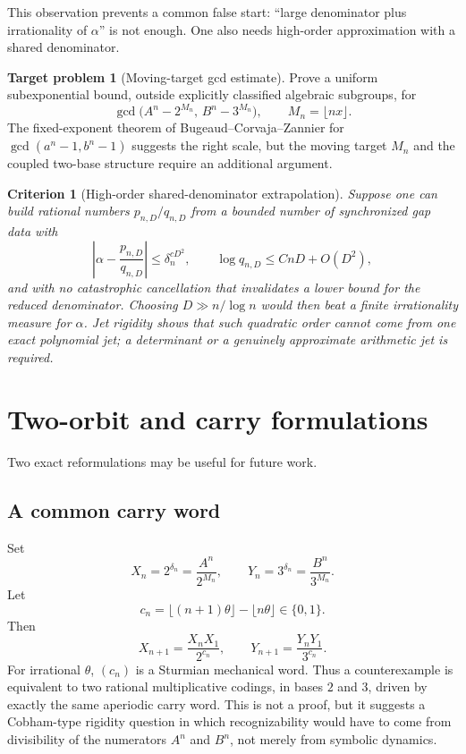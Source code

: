 \documentclass[11pt]{article}
\newtheorem{criterion}[theorem]{Criterion}
\theoremstyle{definition}
\newtheorem{problem}[theorem]{Target problem}
\theoremstyle{remark}
\begin{document}
This observation prevents a common false start: ``large denominator plus irrationality of $\alpha$'' is not enough. One also needs high-order approximation with a shared denominator.

\begin{problem}[Moving-target gcd estimate]\label{prob:moving-gcd}
Prove a uniform subexponential bound, outside explicitly classified algebraic subgroups, for
\[
 \gcd\bigl(A^n-2^{M_n},\,B^n-3^{M_n}\bigr),
 \qquad M_n=\lfloor nx\rfloor.
\]
The fixed-exponent theorem of Bugeaud--Corvaja--Zannier for $\gcd(a^n-1,b^n-1)$ suggests the right scale, but the moving target $M_n$ and the coupled two-base structure require an additional argument.
\end{problem}

\begin{criterion}[High-order shared-denominator extrapolation]
Suppose one can build rational numbers $p_{n,D}/q_{n,D}$ from a bounded number of synchronized gap data with
\[
 \left|\alpha-\frac{p_{n,D}}{q_{n,D}}\right|
 \le \delta_n^{cD^2},
 \qquad
 \log q_{n,D}\le CnD+O(D^2),
\]
and with no catastrophic cancellation that invalidates a lower bound for the reduced denominator. Choosing $D\gg n/\log n$ would then beat a finite irrationality measure for $\alpha$. Jet rigidity shows that such quadratic order cannot come from one exact polynomial jet; a determinant or a genuinely approximate arithmetic jet is required.
\end{criterion}

\section{Two-orbit and carry formulations}\label{sec:dynamics}

Two exact reformulations may be useful for future work.

\subsection{A common carry word}

Set
\[
 X_n=2^{\delta_n}=\frac{A^n}{2^{M_n}},
 \qquad
 Y_n=3^{\delta_n}=\frac{B^n}{3^{M_n}}.
\]
Let
\[
 c_n=\lfloor(n+1)\theta\rfloor-\lfloor n\theta\rfloor\in\{0,1\}.
\]
Then
\begin{equation}\label{eq:carry-dynamics}
 X_{n+1}=\frac{X_nX_1}{2^{c_n}},
 \qquad
 Y_{n+1}=\frac{Y_nY_1}{3^{c_n}}.
\end{equation}
For irrational $\theta$, $(c_n)$ is a Sturmian mechanical word. Thus a counterexample is equivalent to two rational multiplicative codings, in bases $2$ and $3$, driven by exactly the same aperiodic carry word. This is not a proof, but it suggests a Cobham-type rigidity question in which recognizability would have to come from divisibility of the numerators $A^n$ and $B^n$, not merely from symbolic dynamics.
\end{document}
